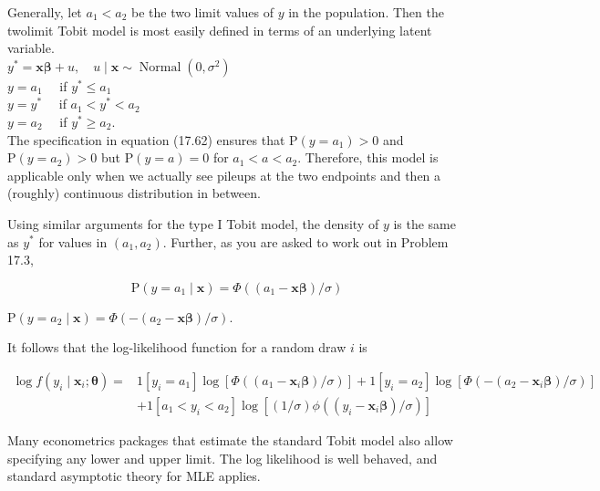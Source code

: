 \documentclass[10pt]{article}
\begin{document}
Generally, let $a_{1}<a_{2}$ be the two limit values of $y$ in the population. Then the twolimit Tobit model is most easily defined in terms of an underlying latent variable.\\
$y^{*}=\mathbf{x} \boldsymbol{\beta}+u, \quad u \mid \mathbf{x} \sim \operatorname{Normal}\left(0, \sigma^{2}\right)$\\
$y=a_{1} \quad$ if $y^{*} \leq a_{1}$\\
$y=y^{*} \quad$ if $a_{1}<y^{*}<a_{2}$\\
$y=a_{2} \quad$ if $y^{*} \geq a_{2}$.\\
The specification in equation (17.62) ensures that $\mathrm{P}\left(y=a_{1}\right)>0$ and $\mathrm{P}\left(y=a_{2}\right)>0$ but $\mathrm{P}(y=a)=0$ for $a_{1}<a<a_{2}$. Therefore, this model is applicable only when we actually see pileups at the two endpoints and then a (roughly) continuous distribution in between.

Using similar arguments for the type I Tobit model, the density of $y$ is the same as $y^{*}$ for values in $\left(a_{1}, a_{2}\right)$. Further, as you are asked to work out in Problem 17.3,


\begin{equation*}
\mathrm{P}\left(y=a_{1} \mid \mathbf{x}\right)=\Phi\left(\left(a_{1}-\mathbf{x} \boldsymbol{\beta}\right) / \sigma\right) \tag{17.63}
\end{equation*}


$\mathrm{P}\left(y=a_{2} \mid \mathbf{x}\right)=\Phi\left(-\left(a_{2}-\mathbf{x} \boldsymbol{\beta}\right) / \sigma\right)$.

It follows that the log-likelihood function for a random draw $i$ is

$$
\begin{aligned}
\log f\left(y_{i} \mid \mathbf{x}_{i} ; \boldsymbol{\theta}\right)= & 1\left[y_{i}=a_{1}\right] \log \left[\Phi\left(\left(a_{1}-\mathbf{x}_{i} \boldsymbol{\beta}\right) / \sigma\right)\right]+1\left[y_{i}=a_{2}\right] \log \left[\Phi\left(-\left(a_{2}-\mathbf{x}_{i} \boldsymbol{\beta}\right) / \sigma\right)\right] \\
& +1\left[a_{1}<y_{i}<a_{2}\right] \log \left[(1 / \sigma) \phi\left(\left(y_{i}-\mathbf{x}_{i} \boldsymbol{\beta}\right) / \sigma\right)\right]
\end{aligned}
$$

Many econometrics packages that estimate the standard Tobit model also allow specifying any lower and upper limit. The log likelihood is well behaved, and standard asymptotic theory for MLE applies.
\end{document}
